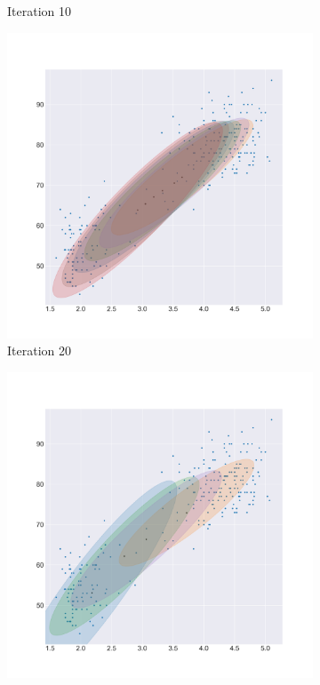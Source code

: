 \documentclass[letterpaper]{article}
\begin{document}
\begin{figure}[H]
\begin{subfigure}[b]{0.25\linewidth}
    \caption{Iteration 10}
  \end{subfigure}
  \begin{subfigure}[b]{0.25\linewidth}
    \includegraphics[width=\linewidth]{outputs/old_faithful/iter_20.png}
    \caption{Iteration 20}
  \end{subfigure}
  \begin{subfigure}[b]{0.25\linewidth}
    \includegraphics[width=\linewidth]{outputs/old_faithful/iter_30.png}

\end{subfigure}
\end{figure}
\end{document}
